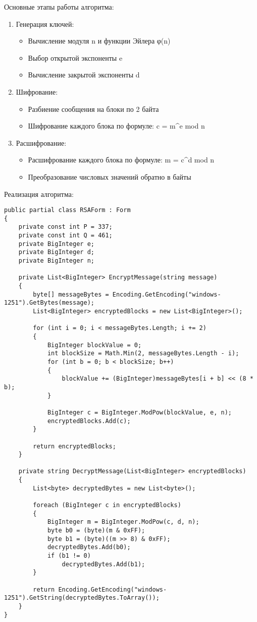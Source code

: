 \documentclass[a4paper, 14pt]{extarticle}
\begin{document}
Основные этапы работы алгоритма:
\begin{enumerate}
    \item Генерация ключей:
    \begin{itemize}
        \item Вычисление модуля n и функции Эйлера φ(n)
        \item Выбор открытой экспоненты e
        \item Вычисление закрытой экспоненты d
    \end{itemize}
    \item Шифрование:
    \begin{itemize}
        \item Разбиение сообщения на блоки по 2 байта
        \item Шифрование каждого блока по формуле: c = m^e mod n
    \end{itemize}
    \item Расшифрование:
    \begin{itemize}
        \item Расшифрование каждого блока по формуле: m = c^d mod n
        \item Преобразование числовых значений обратно в байты
    \end{itemize}
\end{enumerate}

Реализация алгоритма:
\begin{lstlisting}[caption=Реализация RSA]
public partial class RSAForm : Form
{
    private const int P = 337;
    private const int Q = 461;
    private BigInteger e;
    private BigInteger d;
    private BigInteger n;

    private List<BigInteger> EncryptMessage(string message)
    {
        byte[] messageBytes = Encoding.GetEncoding("windows-1251").GetBytes(message);
        List<BigInteger> encryptedBlocks = new List<BigInteger>();

        for (int i = 0; i < messageBytes.Length; i += 2)
        {
            BigInteger blockValue = 0;
            int blockSize = Math.Min(2, messageBytes.Length - i);
            for (int b = 0; b < blockSize; b++)
            {
                blockValue += (BigInteger)messageBytes[i + b] << (8 * b);
            }

            BigInteger c = BigInteger.ModPow(blockValue, e, n);
            encryptedBlocks.Add(c);
        }

        return encryptedBlocks;
    }

    private string DecryptMessage(List<BigInteger> encryptedBlocks)
    {
        List<byte> decryptedBytes = new List<byte>();

        foreach (BigInteger c in encryptedBlocks)
        {
            BigInteger m = BigInteger.ModPow(c, d, n);
            byte b0 = (byte)(m & 0xFF);
            byte b1 = (byte)((m >> 8) & 0xFF);
            decryptedBytes.Add(b0);
            if (b1 != 0)
                decryptedBytes.Add(b1);
        }

        return Encoding.GetEncoding("windows-1251").GetString(decryptedBytes.ToArray());
    }
}
\end{lstlisting}
\end{document}

